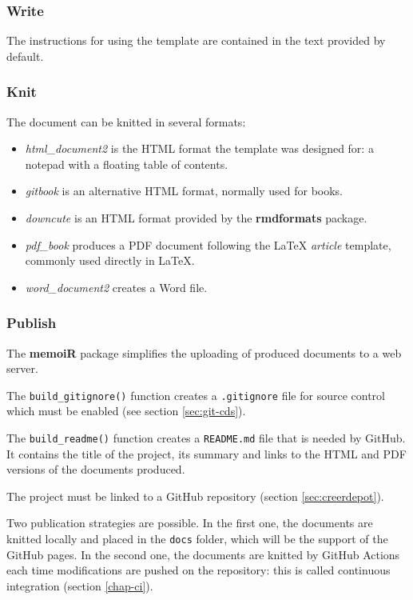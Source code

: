 \documentclass[
  12pt,
  american,
  a4paper,
  extrafontsizes,onecolumn,openright
  ]{memoir}
\providecommand{\tightlist}{%
  \setlength{\itemsep}{0pt}\setlength{\parskip}{0pt}}
\begin{document}
\hypertarget{write}{%
\subsubsection{Write}\label{write}}

The instructions for using the template are contained in the text provided by default.

\hypertarget{knit}{%
\subsubsection{Knit}\label{knit}}

The document can be knitted in several formats:

\begin{itemize}
\tightlist
\item
  \emph{html\_document2} is the HTML format the template was designed for: a notepad with a floating table of contents.
\item
  \emph{gitbook} is an alternative HTML format, normally used for books.
\item
  \emph{downcute} is an HTML format provided by the \textbf{rmdformats} package.
\item
  \emph{pdf\_book} produces a PDF document following the LaTeX \emph{article} template, commonly used directly in LaTeX.
\item
  \emph{word\_document2} creates a Word file.
\end{itemize}

\hypertarget{sec:article-en-ligne}{%
\subsubsection{Publish}\label{sec:article-en-ligne}}

The \textbf{memoiR} package simplifies the uploading of produced documents to a web server.

The \texttt{build\_gitignore()} function creates a \texttt{.gitignore} file for source control which must be enabled (see section \ref{sec:git-cds}).

The \texttt{build\_readme()} function creates a \texttt{README.md} file that is needed by GitHub.
It contains the title of the project, its summary and links to the HTML and PDF versions of the documents produced.

The project must be linked to a GitHub repository (section \ref{sec:creerdepot}).

Two publication strategies are possible.
In the first one, the documents are knitted locally and placed in the \texttt{docs} folder, which will be the support of the GitHub pages.
In the second one, the documents are knitted by GitHub Actions each time modifications are pushed on the repository: this is called continuous integration (section \ref{chap-ci}).
\end{document}
